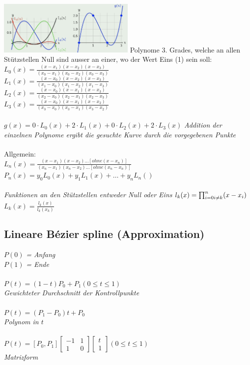 \includegraphics[width=0.5\textwidth]{assets/Lagrange1.png}
Polynome 3. Grades, welche an allen Stützstellen Null sind ausser an einer, wo der Wert Eins (1) sein soll:
$L_0(x) = \frac{(x-x_1)(x-x_2)(x-x_3)}{(x_0-x_1)(x_0-x_2)(x_0-x_3)}$ \\
$L_1(x) = \frac{(x-x_0)(x-x_2)(x-x_3)}{(x_1-x_0)(x_1-x_2)(x_1-x_3)}$ \\
$L_2(x) = \frac{(x-x_0)(x-x_1)(x-x_3)}{(x_2-x_0)(x_2-x_1)(x_2-x_3)}$ \\
$L_3(x) = \frac{(x-x_0)(x-x_1)(x-x_2)}{(x_3-x_0)(x_3-x_1)(x_3-x_2)}$ \\
\\
$g(x) = 0 \cdot L_0(x) + 2 \cdot L_1(x) + 0 \cdot L_2(x) + 2 \cdot L_3(x)$
\textit{Addition der einzelnen Polynome ergibt die gesuchte Kurve durch die vorgegebenen Punkte}\\
\\

Allgemein:\\
$L_n(x) = \frac{(x-x_1)(x-x_2)\dots[ohne (x-x_n)]}{(x_n-x_1)(x_n-x_2)\dots[ohne (x_n-x_n)]}$ \\
$P_n(x) = y_0L_0(x)+y_1L_1(x)+ \dots + y_nL_n()$ \\
\\
\textit{Funktionen an den Stützstellen entweder Null oder Eins}
$l_k(x) = \prod^{n}_{i=0 \\ i \neq k}(x-x_i)$ \\
$L_k(x) = \frac{l_k(x)}{l_k(x_k)}$

\subsection{Lineare Bézier spline (Approximation)}

$P(0)$ \textit{= Anfang}\\
$P(1)$ \textit{= Ende}\\
\\
$P(t) = (1 - t) P_0 + P_1 (0 \leq t \leq 1)$ \\
\textit{Gewichteter Durchschnitt der Kontrollpunkte} \\
\\
$P(t) = (P_1 - P_0) t + P_0$ \\
\textit{Polynom in $t$} \\
\\
$P(t) = [P_0, P_1] \begin{bmatrix}
    -1 & 1 \\ 1 & 0
\end{bmatrix}
\begin{bmatrix}
    t \\ 1
\end{bmatrix} (0 \leq t \leq 1)$ \\
\textit{Matrizform}

